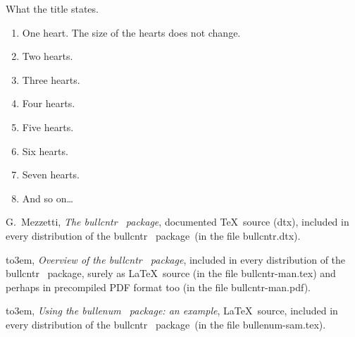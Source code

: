 \documentclass[a4paper]{article}
\DeclareRobustCommand*{\packlass}[1]{%
	{\texorpdfstring{\normalfont \sffamily}{}#1}%
}
\DeclareRobustCommand*{\filedir}[1]{{\normalfont\ttfamily #1}}
\newcommand*{\Bullcntr}{bullcntr}
\newcommand*{\bull}{\packlass{\Bullcntr}}
\newcommand*{\tbull}{the \bull\ package}
\newcommand*{\Bullenum}{bullenum}
\newcommand*{\benu}{\packlass{\Bullenum}}
\newcommand*{\tbenu}{the \benu\ package}
\begin{document}
What the title states.

\begin{enumerate}
	\renewcommand*{\theenumi}{\bullcntr{enumi}}
	\renewcommand*{\labelenumi}{\theenumi}
	\heartctrbull
	
	\item  One heart.  The size of the hearts does not change.
	\item  Two hearts.
	\item  Three hearts.
	\item  Four hearts.
	\item  Five hearts.
	\item  Six hearts.
	\item  Seven hearts.
	\item  And so on\ldots
\end{enumerate}



\setcounter{secnumdepth}{0}
\providecommand*\bysame{\leavevmode\hbox to3em{\hrulefill}\thinspace}

\begin{thebibliography}{9}
	\providecommand*{\bysame}{\leavevmode\hbox to3em{\hrulefill}\thinspace}

		G.~Mezzetti, \emph{The \bull\ package}, documented \TeX\
		source (dtx), included in every distribution of \tbull\ (in
		the file \filedir{\Bullcntr.dtx}).

		\bysame, \emph{Overview of \tbull}, included in every
		distribution of \tbull, surely as \LaTeX\ source (in the file
		\filedir{\Bullcntr-man.tex}) and perhaps in precompiled PDF
		format too (in the file \filedir{\Bullcntr-man.pdf}).

		\bysame, \emph{Using \tbenu: an example}, \LaTeX\ source,
		included in every distribution of \tbull\ (in the file
		\filedir{\Bullenum-sam.tex}).
\end{thebibliography}
\end{document}
